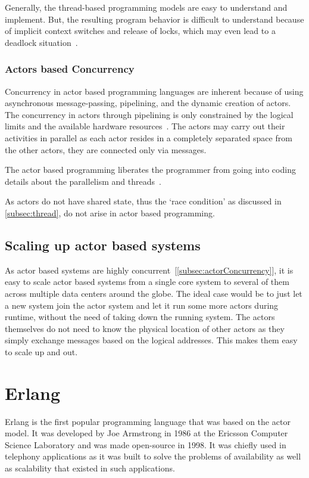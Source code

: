  Generally, the thread-based programming models are easy to understand and implement. But, the resulting program behavior is difficult to understand because of implicit context switches and release of locks, which may even lead to a deadlock situation~\cite{ambientTalk}.

\subsubsection{Actors based Concurrency}
\label{subsec:actorConcurrency}
  Concurrency in actor based programming languages are inherent because of using asynchronous message-passing, pipelining, and the dynamic creation of actors.
The concurrency in actors through pipelining is only constrained by the logical limits and the available hardware resources~\cite{agha}. The actors may carry out their activities in parallel as each actor resides in a completely separated space from the other actors, they are connected only via messages.

  The actor based programming liberates the programmer from going into coding details about the parallelism and threads~\cite{agha}.

  As actors do not have shared state, thus the ‘race condition’ as discussed in \autoref{subsec:thread}, do not arise in actor based programming.

\subsection{Scaling up actor based systems}
  As actor based systems are highly concurrent~[\autoref{subsec:actorConcurrency}], it is easy to scale actor based systems from a single core system to several of them across multiple data centers around the globe. The ideal case would be to just let a new system join the actor system and let it run some more actors during runtime, without the need of taking down the running system. The actors themselves do not need to know the physical location of other actors as they simply exchange messages based on the logical addresses. This makes them easy to scale up and out.

\section{Erlang}
\label{sec:erlang}
  Erlang is the first popular programming language that was based on the actor model\cite{vinoski}. It was developed by Joe Armstrong in 1986 at the Ericsson Computer Science Laboratory and was made open-source in 1998. It was chiefly used in telephony applications as it was built to solve the problems of availability as well as scalability that existed in such applications.~\parencite{armstrong}

